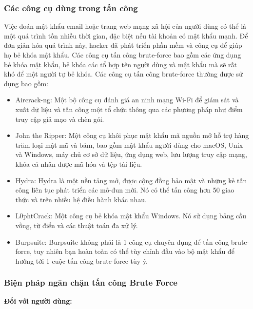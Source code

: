 \subsubsection{ Các công cụ dùng trong tấn công}
 Việc đoán mật khẩu email hoặc trang web mạng xã hội của người dùng có thể là một quá trình tốn nhiều thời gian, đặc biệt nếu tài khoản có mật khẩu mạnh. Để đơn giản hóa quá trình này, hacker đã phát triển phần mềm và công cụ để giúp họ bẻ khóa mật khẩu.
Các công cụ tấn công brute-force bao gồm các ứng dụng bẻ khóa mật khẩu, bẻ khóa các tổ hợp tên người dùng và mật khẩu mà sẽ rất khó để một người tự bẻ khóa. Các công cụ tấn công brute-force thường được sử dụng bao gồm:
\begin{itemize}
    \item Aircrack-ng:
Một bộ công cụ đánh giá an ninh mạng Wi-Fi để giám sát và xuất dữ liệu và tấn công một tổ chức thông qua các phương pháp như điểm truy cập giả mạo và chèn gói.
\item John the Ripper:
Một công cụ khôi phục mật khẩu mã nguồn mở hỗ trợ hàng trăm loại mật mã và băm, bao gồm mật khẩu người dùng cho macOS, Unix và Windows, máy chủ cơ sở dữ liệu, ứng dụng web, lưu lượng truy cập mạng, khóa cá nhân được mã hóa và tệp tài liệu.
\item Hydra:
Hydra là một nền tảng mở, được cộng đồng bảo mật và những kẻ tấn công liên tục phát triển các mô-đun mới. Nó có thể tấn công hơn 50 giao thức và trên nhiều hệ điều hành khác nhau.
\item L0phtCrack:
Một công cụ bẻ khóa mật khẩu Windows. Nó sử dụng bảng cầu vồng, từ điển và các thuật toán đa xử lý.
\item Burpsuite:
Burpsuite không phải là 1 công cụ chuyên dụng để tấn công brute-force, tuy nhiên bạn hoàn toàn có thể tùy chỉnh đầu vào bộ mật khẩu để hướng tới 1 cuộc tấn công brute-force tùy ý.

\end{itemize}
\subsubsection{ Biện pháp ngăn chặn tấn công Brute Force}
\textbf{Đối với người dùng:}

